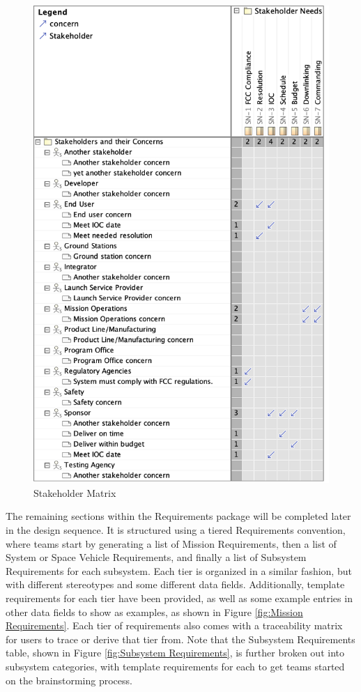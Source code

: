 \begin{figure}[H]
    \centering
    \includegraphics[width=4 in]{Thesis/Analysis_and_Results/Analysis and Results Figures/Stakeholder Matrix.png}
    \caption{Stakeholder Matrix}
    \label{fig:Stakeholder Matrix}
\end{figure}

The remaining sections within the Requirements package will be completed later in the design sequence. It is structured using a tiered Requirements convention, where teams start by generating a list of Mission Requirements, then a list of System or Space Vehicle Requirements, and finally a list of Subsystem Requirements for each subsystem. Each tier is organized in a similar fashion, but with different stereotypes and some different data fields. Additionally, template requirements for each tier have been provided, as well as some example entries in other data fields to show as examples, as shown in Figure \ref{fig:Mission Requirements}. Each tier of requirements also comes with a traceability matrix for users to trace or derive that tier from. Note that the Subsystem Requirements table, shown in Figure \ref{fig:Subsystem Requirements}, is further broken out into subsystem categories, with template requirements for each to get teams started on the brainstorming process. 

